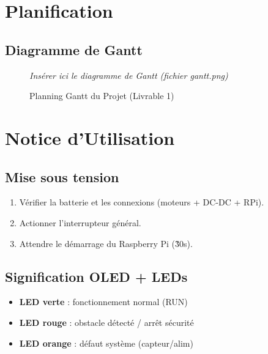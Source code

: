\documentclass[a4paper,12pt]{report}
\begin{document}
\chapter{Planification}

\section{Diagramme de Gantt}
\begin{landscape}
    \thispagestyle{empty}
    \begin{figure}[H]
        \centering
        \vspace*{1cm}
        \begin{tcolorbox}[colback=UTLight,colframe=UTSlate,title=Diagramme de Gantt]\centering\textit{Insérer ici le diagramme de Gantt (fichier gantt.png)}\end{tcolorbox}
        \caption{Planning Gantt du Projet (Livrable 1)}
    \end{figure}
\end{landscape}

\chapter{Notice d’Utilisation}

\section{Mise sous tension}
\begin{enumerate}
    \item Vérifier la batterie et les connexions (moteurs + DC-DC + RPi).
    \item Actionner l’interrupteur général.
    \item Attendre le démarrage du Raspberry Pi (\~30s).
\end{enumerate}

\section{Signification OLED + LEDs}
\begin{itemize}
    \item \textbf{LED verte} : fonctionnement normal (RUN)
    \item \textbf{LED rouge} : obstacle détecté / arrêt sécurité
    \item \textbf{LED orange} : défaut système (capteur/alim)
\end{itemize}
\end{document}
